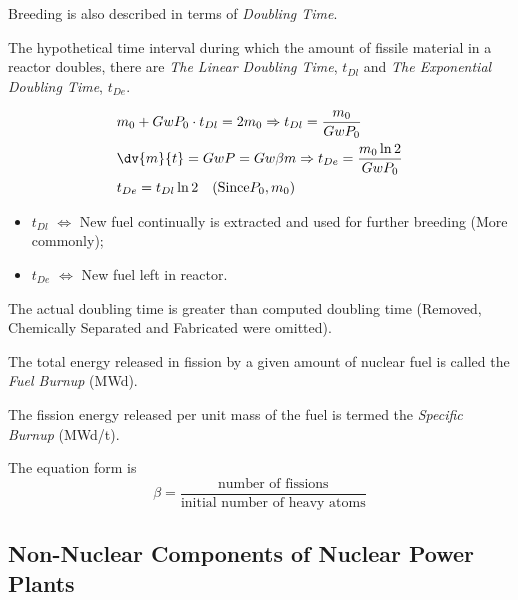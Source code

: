 Breeding is also described in terms of {\itshape Doubling Time}.

\begin{definition}
    The hypothetical time interval during which the amount of fissile material in a reactor doubles, there are {\itshape The Linear Doubling Time}, $t_{Dl}$ and {\itshape The Exponential Doubling Time}, $t_{De}$.
\end{definition}

\begin{align}
    &m_0 + GwP_0 \cdot t_{Dl} = 2m_0 \Rightarrow t_{Dl} = \frac{m_0}{GwP_0} \\ 
    &\dv{m}{t} = GwP = Gw\beta m \Rightarrow t_{De} = \frac{m_0 \ln 2}{GwP_0} \\
    &t_{De} = t_{Dl} \ln 2 \quad (\text{Since} P_0, m_0)
\end{align}

\begin{itemize}
    \item $t_{Dl}$ $\Leftrightarrow$ New fuel continually is extracted and used for further breeding (More commonly);
    \item $t_{De}$ $\Leftrightarrow$ New fuel left in reactor.
\end{itemize}

The actual doubling time is greater than computed doubling time (Removed, Chemically Separated and Fabricated were omitted).

\begin{definition}
    The total energy released in fission by a given amount of nuclear fuel is called the {\itshape Fuel Burnup} (MWd).
\end{definition}

\begin{definition}
    The fission energy released per unit mass of the fuel is termed the {\itshape Specific Burnup} (MWd/t).
\end{definition}

\begin{definition}
    The equation form is
    \begin{equation}
        \beta = \frac{\text{number of fissions}}{\text{initial number of heavy atoms}}
    \end{equation}
\end{definition}

\subsection{Non-Nuclear Components of Nuclear Power Plants}

